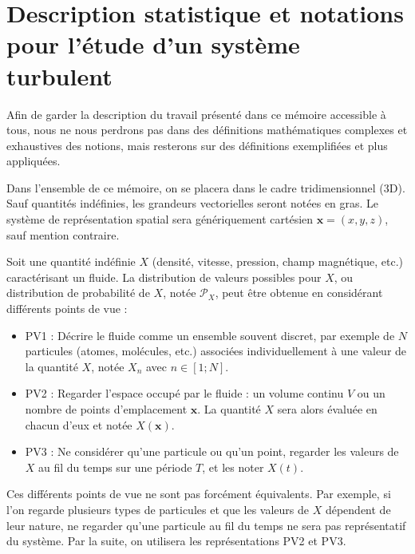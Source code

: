 \section{Description statistique et notations pour l'étude d'un système turbulent}\label{sec-012}

Afin de garder la description du travail présenté dans ce mémoire accessible à tous, nous ne nous perdrons pas dans des définitions mathématiques complexes et exhaustives des notions, mais resterons sur des définitions exemplifiées et plus appliquées. 

Dans l'ensemble de ce mémoire, on se placera dans le cadre tridimensionnel (3D). Sauf quantités indéfinies, les grandeurs vectorielles seront notées en gras. Le système de représentation spatial sera génériquement cartésien $\mathbf{x} = (x,y,z)$, sauf mention contraire.

Soit une quantité indéfinie $X$ (densité, vitesse, pression, champ magnétique, etc.) caractérisant un fluide. La distribution de valeurs possibles pour $X$, ou distribution de probabilité de $X$, notée $\mathcal{P}_X$, peut être obtenue en considérant différents points de vue :
\begin{itemize}
    \item PV1 : Décrire le fluide comme un ensemble souvent discret, par exemple de $N$ particules (atomes, molécules, etc.) associées individuellement à une valeur de la quantité $X$, notée $X_n$ avec $n \in [1;N]$. 
    \item PV2 : Regarder l'espace occupé par le fluide : un volume continu $V$ ou un nombre de points d'emplacement $\mathbf{x}$. La quantité $X$ sera alors évaluée en chacun d'eux et notée $X(\mathbf{x})$. 
    \item PV3 : Ne considérer qu'une particule ou qu'un point, regarder les valeurs de $X$ au fil du temps sur une période $T$, et les noter $X(t)$. 
\end{itemize}
Ces différents points de vue ne sont pas forcément équivalents. Par exemple, si l'on regarde plusieurs types de particules et que les valeurs de $X$ dépendent de leur nature, ne regarder qu'une particule au fil du temps ne sera pas représentatif du système. Par la suite, on utilisera les représentations PV2 et PV3.  

